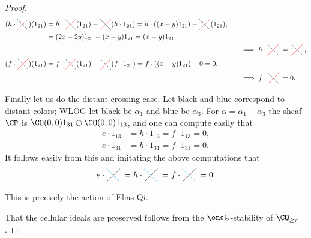 \documentclass[11pt,reqno]{amsart}
\newcommand{\tikzcrossrb}{\hackcenter{\begin{tikzpicture}[scale=0.375]
    \draw[red](0,0)--(1.5,1.5);
    \draw[black](1.5,0)--(0,1.5);
\end{tikzpicture}}}
\newcommand{\tikzcrossdistant}{\hackcenter{\begin{tikzpicture}[scale=0.375]
    \draw[black](0,0)--(1.5,1.5);
    \draw[cyan](1.5,0)--(0,1.5);
\end{tikzpicture}}}
\begin{document}
\begin{proof}
\begin{align*}
        (h\cdot\tikzcrossrb)(1_{21})&=h\cdot\tikzcrossrb(1_{21})-\tikzcrossrb(h\cdot 1_{21})=h\cdot((x-y)1_{21})-\tikzcrossrb(1_{21}),\\
        &=(2x-2y)1_{21}-(x-y)1_{21}=(x-y)1_{21}\\
        &\hspace*{275pt}\implies h\cdot\tikzcrossrb\:=\:\tikzcrossrb\:;\\
        (f\cdot\tikzcrossrb)(1_{21})&=f\cdot\tikzcrossrb(1_{21})-\tikzcrossrb(f\cdot 1_{21})=f\cdot ((x-y)1_{21})-0=0,\\
        &\hspace*{275pt}\implies f\cdot \tikzcrossrb\:=0.
    \end{align*}

    Finally let us do the distant crossing case. Let black and blue correspond to distant colors; WLOG let black be $\alpha_1$ and blue be $\alpha_3$. For $\alpha=\alpha_1+\alpha_3$ the sheaf $\CP$ is $\CO(0,0)1_{31}\oplus \CO(0,0)1_{13}$, and one can compute easily that
    \begin{align*}
        e\cdot 1_{13}&=h\cdot 1_{13}=f\cdot 1_{13}=0,\\
        e\cdot 1_{31}&=h\cdot 1_{31}=f\cdot 1_{31}=0.
    \end{align*}
    It follows easily from this and imitating the above computations that
    \[e\cdot \tikzcrossdistant\: = h\cdot \tikzcrossdistant\: = f\cdot \tikzcrossdistant\: =0 .\] 

    This is precisely the action of Elias-Qi.

    That the cellular ideals are preserved follows from the $\sl_2$-stability of $\CQ_{\ge\pi}$. 
\end{proof}

\end{document}
